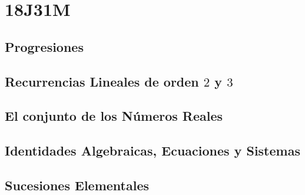 \chapter{18J31M}
\section{Progresiones}

\section{Recurrencias Lineales de orden $2$ y $3$}

\section{El conjunto de los N\'{u}meros Reales}

\section{Identidades Algebraicas, Ecuaciones y Sistemas}

\section{Sucesiones Elementales}
